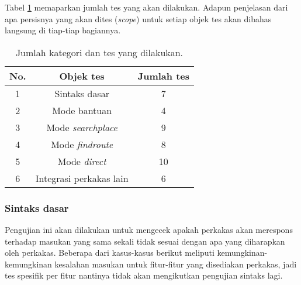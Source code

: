 Tabel \ref{tab:testing-experiments-testing-overview} memaparkan jumlah tes yang akan dilakukan. Adapun penjelasan dari apa persisnya yang akan dites (\textit{scope}) untuk setiap objek tes akan dibahas langsung di tiap-tiap bagiannya.

\begin{table}[H]
    \centering
    \begin{tabular}{| c | c | c |}
    \hline
        \textbf{No.} & \textbf{Objek tes} & \textbf{Jumlah tes} \\
    \hline
    \hline
        1 & Sintaks dasar & 7 \\
    \hline
        2 & Mode bantuan & 4 \\
    \hline
        3 & Mode \textit{searchplace} & 9 \\
    \hline
        4 & Mode \textit{findroute} & 8 \\
    \hline
        5 & Mode \textit{direct} & 10 \\
    \hline
        6 & Integrasi perkakas \cl\xspace lain & 6 \\
    \hline
	\end{tabular}
    \caption{Jumlah kategori dan tes yang dilakukan.}
    \label{tab:testing-experiments-testing-overview}
\end{table}
\vspace*{-2.5em} %
\subsubsection{Sintaks dasar}
\label{sec:testing-experiments-testing-basic}

Pengujian ini akan dilakukan untuk mengecek apakah perkakas akan merespons terhadap masukan yang sama sekali tidak sesuai dengan apa yang diharapkan oleh perkakas. Beberapa dari kasus-kasus berikut meliputi kemungkinan-kemungkinan kesalahan masukan untuk fitur-fitur yang disediakan perkakas, jadi tes spesifik per fitur nantinya tidak akan mengikutkan pengujian sintaks lagi.

